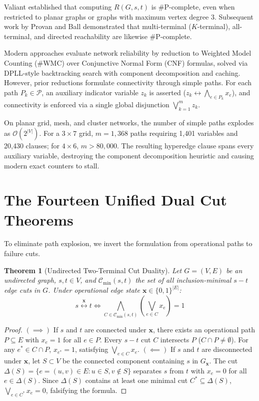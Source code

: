 \documentclass[10pt,journal,compsoc]{IEEEtran}
\newtheorem{theorem}{Theorem}
\begin{document}
Valiant \cite{valiant1979} established that computing $R(G, s, t)$ is \#P-complete, even when restricted to planar graphs or graphs with maximum vertex degree 3. Subsequent work by Provan and Ball \cite{provan1983} demonstrated that multi-terminal ($K$-terminal), all-terminal, and directed reachability are likewise \#P-complete.

Modern approaches evaluate network reliability by reduction to Weighted Model Counting (\#WMC) over Conjunctive Normal Form (CNF) formulas, solved via DPLL-style backtracking search with component decomposition and caching. However, prior reductions formulate connectivity through simple paths. For each path $P_k \in \mathcal{P}$, an auxiliary indicator variable $z_k$ is asserted ($z_k \leftrightarrow \bigwedge_{e \in P_k} x_e$), and connectivity is enforced via a single global disjunction $\bigvee_{k=1}^m z_k$.

On planar grid, mesh, and cluster networks, the number of simple paths explodes as $\mathcal{O}(2^{|V|})$. For a $3\times 7$ grid, $m = 1,368$ paths requiring 1,401 variables and 20,430 clauses; for $4\times 6$, $m > 80,000$. The resulting hyperedge clause spans every auxiliary variable, destroying the component decomposition heuristic and causing modern exact counters to stall.

\section{The Fourteen Unified Dual Cut Theorems}

To eliminate path explosion, we invert the formulation from operational paths to failure cuts.

\begin{theorem}[Undirected Two-Terminal Cut Duality]
Let $G = (V, E)$ be an undirected graph, $s, t \in V$, and $\mathcal{C}_{\text{min}}(s, t)$ the set of all inclusion-minimal $s-t$ edge cuts in $G$. Under operational edge state $\mathbf{x} \in \{0, 1\}^{|E|}$:
\begin{equation}
s \stackrel{\mathbf{x}}{\longleftrightarrow} t \iff \bigwedge_{C \in \mathcal{C}_{\text{min}}(s, t)} \left( \bigvee_{e \in C} x_e \right) = 1
\end{equation}
\end{theorem}

\begin{proof}
$(\implies)$ If $s$ and $t$ are connected under $\mathbf{x}$, there exists an operational path $P \subseteq E$ with $x_e = 1$ for all $e \in P$. Every $s-t$ cut $C$ intersects $P$ ($C \cap P \neq \emptyset$). For any $e^* \in C \cap P$, $x_{e^*} = 1$, satisfying $\bigvee_{e \in C} x_e$.
$(\impliedby)$ If $s$ and $t$ are disconnected under $\mathbf{x}$, let $S \subset V$ be the connected component containing $s$ in $G_{\mathbf{x}}$. The cut $\Delta(S) = \{e = (u, v) \in E : u \in S, v \notin S\}$ separates $s$ from $t$ with $x_e = 0$ for all $e \in \Delta(S)$. Since $\Delta(S)$ contains at least one minimal cut $C^* \subseteq \Delta(S)$, $\bigvee_{e \in C^*} x_e = 0$, falsifying the formula.
\end{proof}
\end{document}
